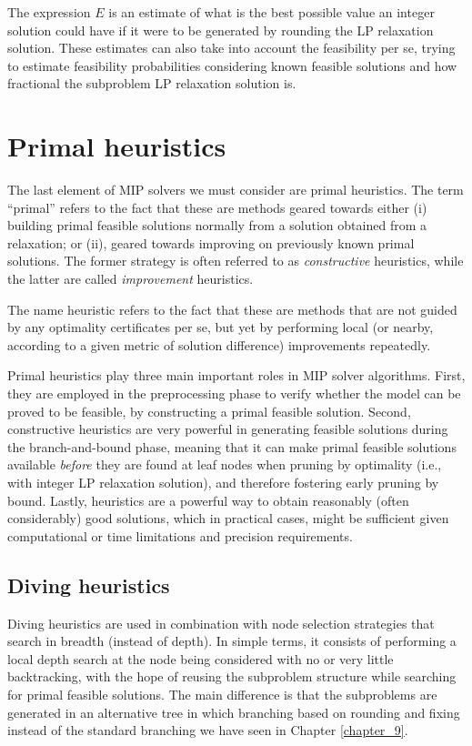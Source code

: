 The expression $E$ is an estimate of what is the best possible value an integer solution could have if it were to be generated by rounding the LP relaxation solution. These estimates can also take into account the feasibility per se, trying to estimate feasibility probabilities considering known feasible solutions and how fractional the subproblem LP relaxation solution is. 



\section{Primal heuristics}
 
The last element of MIP solvers we must consider are primal heuristics. The term ``primal'' refers to the fact that these are methods geared towards either (i) building primal feasible solutions normally from a solution obtained from a relaxation; or (ii), geared towards improving on previously known primal solutions. The former strategy is often referred to as \emph{constructive} heuristics, while the latter are called \emph{improvement} heuristics. 

The name heuristic refers to the fact that these are methods that are not guided by any optimality certificates per se, but yet by performing local (or nearby, according to a given metric of solution difference) improvements repeatedly.

Primal heuristics play three main important roles in MIP solver algorithms. First, they are employed in the preprocessing phase to verify whether the model can be proved to be feasible, by constructing a primal feasible solution. Second, constructive heuristics are very powerful in generating feasible solutions during the branch-and-bound phase, meaning that it can make primal feasible solutions available \emph{before} they are found at leaf nodes when pruning by optimality (i.e., with integer LP relaxation solution), and therefore fostering early pruning by bound. Lastly, heuristics are a powerful way to obtain reasonably (often considerably) good solutions, which in practical cases, might be sufficient given computational or time limitations and precision requirements.


\subsection{Diving heuristics}

Diving heuristics are used in combination with node selection strategies that search in breadth (instead of depth). In simple terms, it consists of performing a local depth search at the node being considered with no or very little backtracking, with the hope of reusing the subproblem structure while searching for primal feasible solutions. The main difference is that the subproblems are generated in an alternative tree in which branching based on rounding and fixing instead of the standard branching we have seen in Chapter \ref{chapter_9}. 

